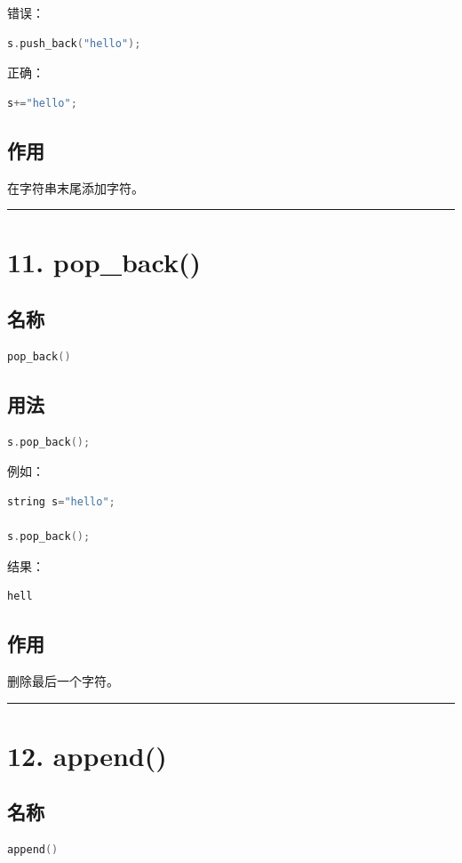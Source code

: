 \documentclass[10pt,twocolumn]{extarticle}
\begin{document}
错误：
\begin{lstlisting}[language=C++]
s.push_back("hello");
\end{lstlisting}
正确：
\begin{lstlisting}[language=C++]
s+="hello";
\end{lstlisting}

\subsection{作用}
在字符串末尾添加字符。

\noindent\rule{\linewidth}{0.4pt}

\section{11. pop\_back()}

\subsection{名称}
\begin{lstlisting}[language=C++]
pop_back()
\end{lstlisting}

\subsection{用法}
\begin{lstlisting}[language=C++]
s.pop_back();
\end{lstlisting}
例如：
\begin{lstlisting}[language=C++]
string s="hello";

s.pop_back();
\end{lstlisting}
结果：
\begin{lstlisting}
hell
\end{lstlisting}

\subsection{作用}
删除最后一个字符。

\noindent\rule{\linewidth}{0.4pt}

\section{12. append()}

\subsection{名称}
\begin{lstlisting}[language=C++]
append()
\end{lstlisting}
\end{document}
